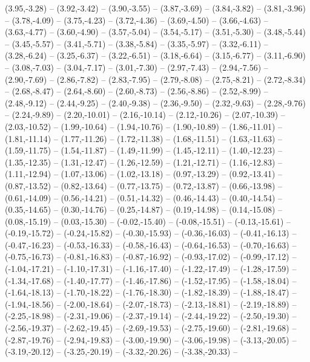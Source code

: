 {  (3.95,-3.28) -- (3.92,-3.42) -- (3.90,-3.55) -- (3.87,-3.69) -- (3.84,-3.82) -- (3.81,-3.96) -- (3.78,-4.09) --
  (3.75,-4.23) -- (3.72,-4.36) -- (3.69,-4.50) -- (3.66,-4.63) -- (3.63,-4.77) -- (3.60,-4.90) -- (3.57,-5.04) --
  (3.54,-5.17) -- (3.51,-5.30) -- (3.48,-5.44) -- (3.45,-5.57) -- (3.41,-5.71) -- (3.38,-5.84) -- (3.35,-5.97) --
  (3.32,-6.11) -- (3.28,-6.24) -- (3.25,-6.37) -- (3.22,-6.51) -- (3.18,-6.64) -- (3.15,-6.77) -- (3.11,-6.90) --
  (3.08,-7.03) -- (3.04,-7.17) -- (3.01,-7.30) -- (2.97,-7.43) -- (2.94,-7.56) -- (2.90,-7.69) -- (2.86,-7.82) --
  (2.83,-7.95) -- (2.79,-8.08) -- (2.75,-8.21) -- (2.72,-8.34) -- (2.68,-8.47) -- (2.64,-8.60) -- (2.60,-8.73) --
  (2.56,-8.86) -- (2.52,-8.99) -- (2.48,-9.12) -- (2.44,-9.25) -- (2.40,-9.38) -- (2.36,-9.50) -- (2.32,-9.63) --
  (2.28,-9.76) -- (2.24,-9.89) -- (2.20,-10.01) -- (2.16,-10.14) -- (2.12,-10.26) -- (2.07,-10.39) -- (2.03,-10.52) --
  (1.99,-10.64) -- (1.94,-10.76) -- (1.90,-10.89) -- (1.86,-11.01) -- (1.81,-11.14) -- (1.77,-11.26) -- (1.72,-11.38) --
  (1.68,-11.51) -- (1.63,-11.63) -- (1.59,-11.75) -- (1.54,-11.87) -- (1.49,-11.99) -- (1.45,-12.11) -- (1.40,-12.23) --
  (1.35,-12.35) -- (1.31,-12.47) -- (1.26,-12.59) -- (1.21,-12.71) -- (1.16,-12.83) -- (1.11,-12.94) -- (1.07,-13.06) --
  (1.02,-13.18) -- (0.97,-13.29) -- (0.92,-13.41) -- (0.87,-13.52) -- (0.82,-13.64) -- (0.77,-13.75) -- (0.72,-13.87) --
  (0.66,-13.98) -- (0.61,-14.09) -- (0.56,-14.21) -- (0.51,-14.32) -- (0.46,-14.43) -- (0.40,-14.54) -- (0.35,-14.65) --
  (0.30,-14.76) -- (0.25,-14.87) -- (0.19,-14.98) -- (0.14,-15.08) -- (0.08,-15.19) -- (0.03,-15.30) -- (-0.02,-15.40) --
  (-0.08,-15.51) -- (-0.13,-15.61) -- (-0.19,-15.72) -- (-0.24,-15.82) -- (-0.30,-15.93) -- (-0.36,-16.03) -- (-0.41,-16.13) --
  (-0.47,-16.23) -- (-0.53,-16.33) -- (-0.58,-16.43) -- (-0.64,-16.53) -- (-0.70,-16.63) -- (-0.75,-16.73) -- (-0.81,-16.83) --
  (-0.87,-16.92) -- (-0.93,-17.02) -- (-0.99,-17.12) -- (-1.04,-17.21) -- (-1.10,-17.31) -- (-1.16,-17.40) -- (-1.22,-17.49) --
  (-1.28,-17.59) -- (-1.34,-17.68) -- (-1.40,-17.77) -- (-1.46,-17.86) -- (-1.52,-17.95) -- (-1.58,-18.04) -- (-1.64,-18.13) --
  (-1.70,-18.22) -- (-1.76,-18.30) -- (-1.82,-18.39) -- (-1.88,-18.47) -- (-1.94,-18.56) -- (-2.00,-18.64) -- (-2.07,-18.73) --
  (-2.13,-18.81) -- (-2.19,-18.89) -- (-2.25,-18.98) -- (-2.31,-19.06) -- (-2.37,-19.14) -- (-2.44,-19.22) -- (-2.50,-19.30) --
  (-2.56,-19.37) -- (-2.62,-19.45) -- (-2.69,-19.53) -- (-2.75,-19.60) -- (-2.81,-19.68) -- (-2.87,-19.76) -- (-2.94,-19.83) --
  (-3.00,-19.90) -- (-3.06,-19.98) -- (-3.13,-20.05) -- (-3.19,-20.12) -- (-3.25,-20.19) -- (-3.32,-20.26) -- (-3.38,-20.33) --
}
